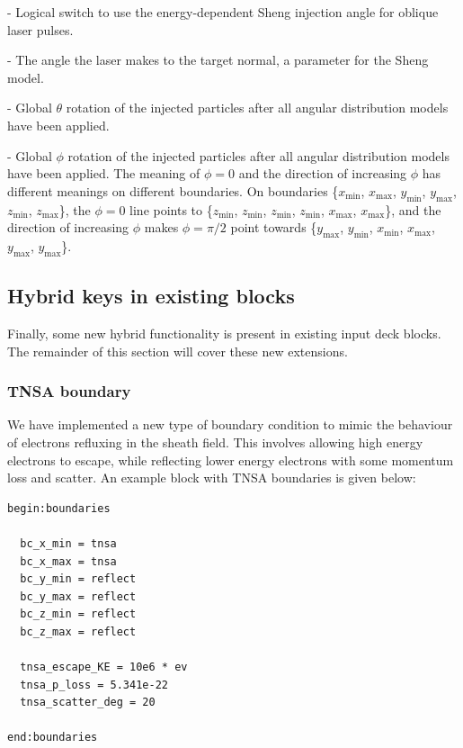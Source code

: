 \documentclass[12pt]{article}
\numberwithin{equation}{section}
\begin{document}
\bigskip {\large\textcolor{blue}{use\_sheng\_dir}} - Logical switch to use the energy-dependent Sheng injection angle for oblique laser pulses.

\bigskip {\large\textcolor{blue}{sheng\_angle}} - The angle the laser makes to the target normal, a parameter for the Sheng model.

\bigskip {\large\textcolor{blue}{theta}} - Global $\theta$ rotation of the injected particles after all angular distribution models have been applied.

\bigskip {\large\textcolor{blue}{phi}} - Global $\phi$ rotation of the injected particles after all angular distribution models have been applied. The meaning of $\phi=0$ and the direction of increasing $\phi$ has different meanings on different boundaries. On boundaries \{$x_\text{min}$, $x_\text{max}$, $y_\text{min}$, $y_\text{max}$, $z_\text{min}$, $z_\text{max}$\}, the $\phi=0$ line points to \{$z_\text{min}$, $z_\text{min}$, $z_\text{min}$, $z_\text{min}$, $x_\text{max}$, $x_\text{max}$\}, and the direction of increasing $\phi$ makes $\phi=\pi/2$ point towards \{$y_\text{max}$, $y_\text{min}$, $x_\text{min}$, $x_\text{max}$, $y_\text{max}$, $y_\text{max}$\}.      

\subsection{Hybrid keys in existing blocks} \label{sec:user:extra}

Finally, some new hybrid functionality is present in existing input deck blocks. The remainder of this section will cover these new extensions.

\subsubsection{TNSA boundary}

We have implemented a new type of boundary condition to mimic the behaviour of electrons refluxing in the sheath field. This involves allowing high energy electrons to escape, while reflecting lower energy electrons with some momentum loss and scatter. An example block with TNSA boundaries is given below:

\begin{lstlisting}[style=myInputDeck]
begin:boundaries

  bc_x_min = tnsa
  bc_x_max = tnsa
  bc_y_min = reflect
  bc_y_max = reflect
  bc_z_min = reflect
  bc_z_max = reflect

  tnsa_escape_KE = 10e6 * ev
  tnsa_p_loss = 5.341e-22
  tnsa_scatter_deg = 20     

end:boundaries
\end{lstlisting}
\end{document}
